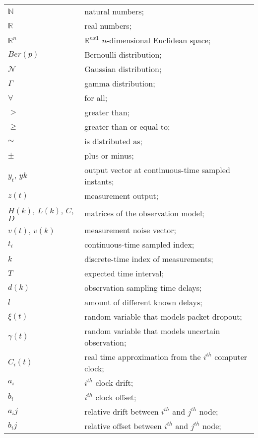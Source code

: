 \begin{longtable}{ll}
	$\mathbb{N}$			& natural numbers; \\
	$\mathbb{R}$			& real numbers; \\
	$\mathbb{R}^n$			& $\mathbb{R}^{nx1}$ $n$-dimensional Euclidean space; \\
	
	$Ber(p)$				& Bernoulli distribution; \\
	$\mathcal{N}$			& Gaussian distribution; \\
	$\Gamma$				& gamma distribution; \\
	
	$\forall$				& for all; \\
	$>$						& greater than; \\
	$\geq$					& greater than or equal to; \\
	$\sim$					& is distributed as; \\
	$\pm$					& plus or minus; \\
	
	$y_{t}$, $y{k}$           	& output vector at continuous-time sampled instants;\\
	$z(t)$						& measurement output; \\
	$H(k)$, $L(k)$, $C$, $D$ 	& matrices of the observation model; \\
	$v(t)$, $v(k)$				& measurement noise vector; \\
	$t_i$ 					& continuous-time sampled index; \\
	$k$						& discrete-time index of measurements;  \\
	$T$						& expected time interval; \\
	$d(k)$					& observation sampling time delays; \\
	$l$						& amount of different known delays; \\
	$\xi(t)$				& random variable that models packet dropout; \\
	$\gamma(t)$				& random variable that models uncertain observation; \\
	$C_i(t)$				& real time approximation from the $i^{th}$ computer clock; \\
	$a_i$					& $i^{th}$ clock drift; \\
	$b_i$					& $i^{th}$ clock offset; \\
	$a_ij$					& relative drift between $i^{th}$ and $j^{th}$ node; \\
	$b_ij$					& relative offset between $i^{th}$ and $j^{th}$ node; \\


\end{longtable}
